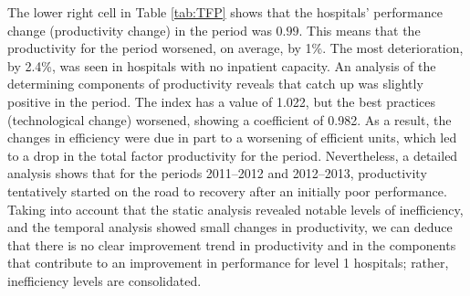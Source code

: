 \documentclass[11pt,a4paper,oneside]{article}
\begin{document}
\color{black}



The lower right cell in Table \ref{tab:TFP} shows that the hospitals' performance change (productivity change) in the period was $0.99$. This means that the productivity for the period worsened, on average, by 1\%. The most deterioration, by 2.4\%, was seen in hospitals with no inpatient capacity. An analysis of the determining components of productivity reveals that catch up was slightly positive in the period. The index has a value of 1.022, but the best practices (technological change) worsened, showing a coefficient of 0.982. As a result, the changes in efficiency were due in part to a worsening of efficient units, which led to a drop in the total factor productivity for the period. Nevertheless, a detailed analysis shows that for the periods 2011--2012 and 2012--2013, productivity tentatively started on the road to recovery after an initially poor performance. Taking into account that the static analysis revealed notable levels of inefficiency, and the temporal analysis showed small changes in productivity, we can deduce that there is no clear improvement trend in productivity and in the components that contribute to an improvement in performance for level 1 hospitals; rather, inefficiency levels are consolidated.
\end{document}
